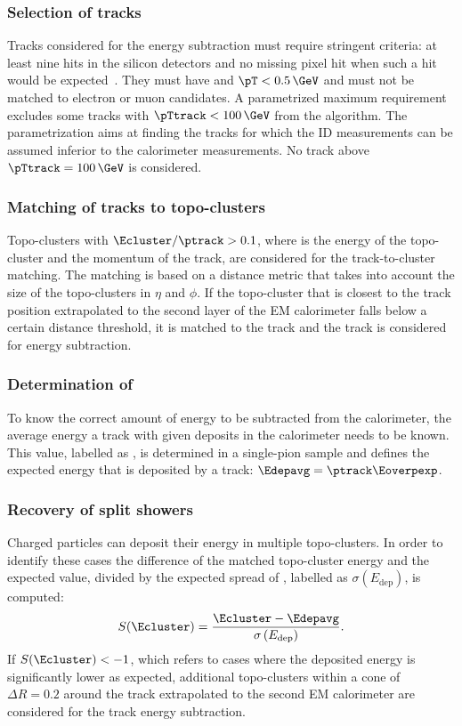 \subsubsection{Selection of tracks} Tracks considered for the energy subtraction must require stringent criteria: at least nine hits in the silicon detectors and no missing pixel hit when such a hit would be expected~\cite{PERF-2015-09}. They must have  and $\pT < 0.5\,\GeV$ and must not be matched to electron or muon candidates. A parametrized maximum \pTtrack requirement excludes some tracks with $\pTtrack < 100\,\GeV$ from the algorithm. The parametrization aims at finding the tracks for which the ID measurements can be assumed inferior to the calorimeter measurements. No track above $\pTtrack = 100\,\GeV$ is considered.

\subsubsection{Matching of tracks to topo-clusters} Topo-clusters with $\Ecluster / \ptrack > 0.1$, where \Ecluster is the energy of the topo-cluster and \ptrack the momentum of the track, are considered for the track-to-cluster matching. The matching is based on a distance metric that takes into account the size of the topo-clusters in $\eta$ and $\phi$. If the topo-cluster that is closest to the track position extrapolated to the second layer of the EM calorimeter falls below a certain distance threshold, it is matched to the track and the track is considered for energy subtraction.

\subsubsection{Determination of \Eoverpexp} To know the correct amount of energy to be subtracted from the calorimeter, the average energy a track with given \pT deposits in the calorimeter needs to be known. This value, labelled as \Eoverpexp, is determined in a single-pion sample and defines the expected energy that is deposited by a track: $\Edepavg = \ptrack \Eoverpexp$.

\subsubsection{Recovery of split showers} Charged particles can deposit their energy in multiple topo-clusters. In order to identify these cases the difference of the matched topo-cluster energy and the expected value, divided by the expected spread of \Edepavg, labelled as $\sigma \left(E_{\text{dep}}\right)$, is computed:
\begin{equation}
    S(\Ecluster) = \frac{ \Ecluster - \Edepavg}{\sigma \left(E_{\text{dep}}\right)}.
\end{equation}
If $S(\Ecluster)  < -1$, which refers to cases where the deposited energy is significantly lower as expected, additional topo-clusters within a cone of $\Delta R = 0.2$ around the track extrapolated to the second EM calorimeter are considered for the track energy subtraction.

